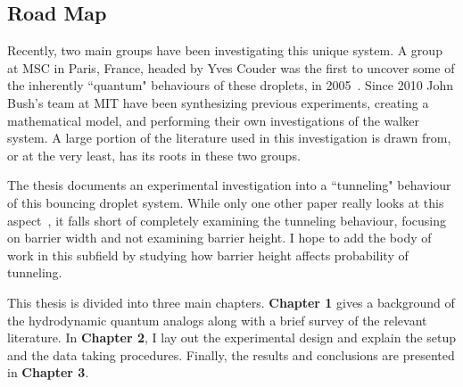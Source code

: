 \subsection{Road Map}	  
	  
	Recently, two main groups have been investigating this unique system. A group at MSC in Paris, France, headed by Yves Couder was the first to uncover some of the inherently ``quantum" behaviours of these droplets, in 2005~\cite{Couder2005b}. Since 2010 John Bush's team at MIT have been synthesizing previous experiments, creating a mathematical model, and performing their own investigations of the walker system. A large portion of the literature used in this investigation is drawn from, or at the very least, has its roots in these two groups. 
		
	The thesis documents an experimental investigation into a ``tunneling" behaviour of this bouncing droplet system. While only one other paper really looks at this aspect~\cite{tunneling}, it falls short of completely examining the tunneling behaviour, focusing on barrier width and not examining barrier height. I hope to add the body of work in this subfield by studying how barrier height affects probability of tunneling.   
	
	This thesis is divided into three main chapters. \textbf{Chapter 1} gives a background of the hydrodynamic quantum analogs along with a brief survey of the relevant literature. In \textbf{Chapter 2}, I lay out the experimental design and explain the setup and the data taking procedures. Finally, the results and conclusions are presented in \textbf{Chapter 3}.	    